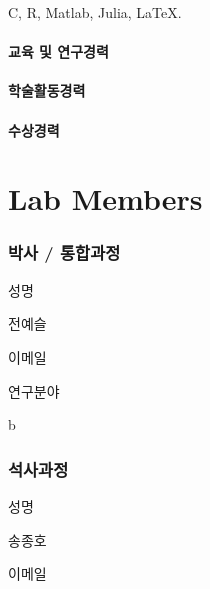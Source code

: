 \documentclass[
]{book}
\begin{document}
C, R, Matlab, Julia, LaTeX.

\hypertarget{uxad50uxc721-uxbc0f-uxc5f0uxad6cuxacbduxb825}{%
\subsubsection*{교육 및 연구경력}\label{uxad50uxc721-uxbc0f-uxc5f0uxad6cuxacbduxb825}}

\hypertarget{uxd559uxc220uxd65cuxb3d9uxacbduxb825}{%
\subsubsection*{학술활동경력}\label{uxd559uxc220uxd65cuxb3d9uxacbduxb825}}

\hypertarget{uxc218uxc0c1uxacbduxb825}{%
\subsubsection*{수상경력}\label{uxc218uxc0c1uxacbduxb825}}

\hypertarget{lab-members}{%
\chapter*{Lab Members}\label{lab-members}}

\hypertarget{uxbc15uxc0ac-uxd1b5uxd569uxacfcuxc815}{%
\subsection*{박사 / 통합과정}\label{uxbc15uxc0ac-uxd1b5uxd569uxacfcuxc815}}

성명

전예슬

이메일

연구분야

b

\hypertarget{uxc11duxc0acuxacfcuxc815}{%
\subsection*{석사과정}\label{uxc11duxc0acuxacfcuxc815}}

성명

송종호

이메일
\end{document}
